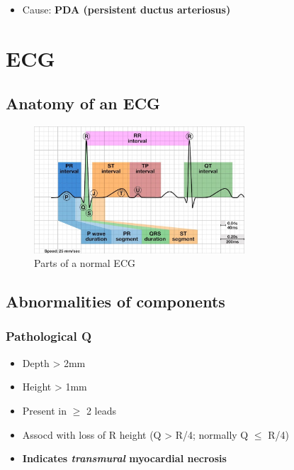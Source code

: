 \documentclass[
  12pt,
]{memoir}
\providecommand{\tightlist}{%
  \setlength{\itemsep}{0pt}\setlength{\parskip}{0pt}}
\begin{document}
\begin{itemize}
\tightlist
\item
  Cause: \textbf{PDA (persistent ductus arteriosus)}
\end{itemize}

\hypertarget{ecg-1}{%
\section{ECG}\label{ecg-1}}

\label{sec:ecg}

\hypertarget{anatomy-of-an-ecg}{%
\subsection{Anatomy of an ECG}\label{anatomy-of-an-ecg}}

\begin{figure}
    \centering
    \includegraphics[width=0.7\textwidth]{../assets/med/ecg-anatomy.jpg}
    \caption{Parts of a normal ECG}
\end{figure}

\hypertarget{abnormalities-of-components}{%
\subsection{Abnormalities of
components}\label{abnormalities-of-components}}

\hypertarget{pathological-q}{%
\subsubsection{Pathological Q}\label{pathological-q}}

\begin{itemize}
\tightlist
\item
  Depth \textgreater{} 2mm
\item
  Height \textgreater{} 1mm
\item
  Present in \(\ge\) 2 leads
\item
  Assocd with loss of R height (Q \textgreater{} R/4; normally Q \(\le\)
  R/4)
\item
  \textbf{Indicates \emph{transmural} myocardial necrosis}
\end{itemize}
\end{document}
